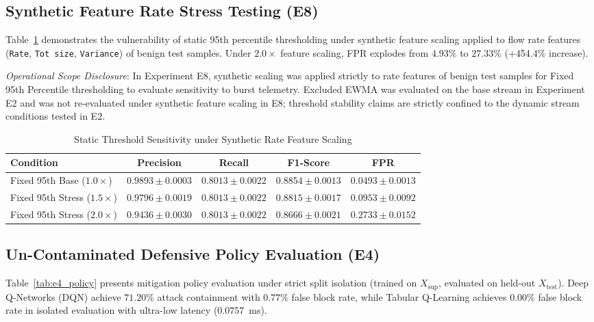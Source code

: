 \documentclass[journal]{IEEEtran}
\begin{document}
\subsection{Synthetic Feature Rate Stress Testing (E8)}
Table~\ref{tab:e8_stress} demonstrates the vulnerability of static 95th percentile thresholding under synthetic feature scaling applied to flow rate features (\texttt{Rate}, \texttt{Tot size}, \texttt{Variance}) of benign test samples. Under $2.0\times$ feature scaling, FPR explodes from $4.93\%$ to $27.33\%$ (+454.4\% increase). 

\textit{Operational Scope Disclosure}: In Experiment E8, synthetic scaling was applied strictly to rate features of benign test samples for Fixed 95th Percentile thresholding to evaluate sensitivity to burst telemetry. Excluded EWMA was evaluated on the base stream in Experiment E2 and was not re-evaluated under synthetic feature scaling in E8; threshold stability claims are strictly confined to the dynamic stream conditions tested in E2.

\begin{table}[h]
\centering
\caption{Static Threshold Sensitivity under Synthetic Rate Feature Scaling}
\label{tab:e8_stress}
\begin{tabular}{lcccc}
\toprule
Condition & Precision & Recall & F1-Score & FPR \\
\midrule
Fixed 95th Base ($1.0\times$) & $0.9893 \pm 0.0003$ & $0.8013 \pm 0.0022$ & $0.8854 \pm 0.0013$ & $0.0493 \pm 0.0013$ \\
Fixed 95th Stress ($1.5\times$) & $0.9796 \pm 0.0019$ & $0.8013 \pm 0.0022$ & $0.8815 \pm 0.0017$ & $0.0953 \pm 0.0092$ \\
Fixed 95th Stress ($2.0\times$) & $0.9436 \pm 0.0030$ & $0.8013 \pm 0.0022$ & $0.8666 \pm 0.0021$ & $\mathbf{0.2733 \pm 0.0152}$ \\
\bottomrule
\end{tabular}
\end{table}

\subsection{Un-Contaminated Defensive Policy Evaluation (E4)}
Table~\ref{tab:e4_policy} presents mitigation policy evaluation under strict split isolation (trained on $X_{\text{sup}}$, evaluated on held-out $X_{\text{test}}$). Deep Q-Networks (DQN) achieve $71.20\%$ attack containment with $0.77\%$ false block rate, while Tabular Q-Learning achieves $0.00\%$ false block rate in isolated evaluation with ultra-low latency ($0.0757$~ms).
\end{document}
